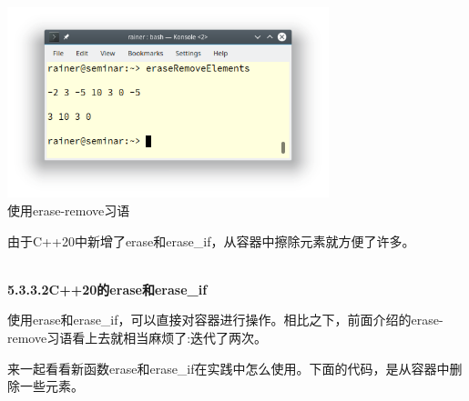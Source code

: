 \begin{center}
\includegraphics[width=0.7\textwidth]{content/3/chapter5/images/12.png}\\
使用erase-remove习语
\end{center}

由于C++20中新增了erase和erase\_if，从容器中擦除元素就方便了许多。

\hspace*{\fill} \\ %
\noindent
\textbf{5.3.3.2\hspace{0.2cm}C++20的erase和erase\_if}

使用erase和erase\_if，可以直接对容器进行操作。相比之下，前面介绍的erase-remove习语看上去就相当麻烦了:迭代了两次。

来一起看看新函数erase和erase\_if在实践中怎么使用。下面的代码，是从容器中删除一些元素。

